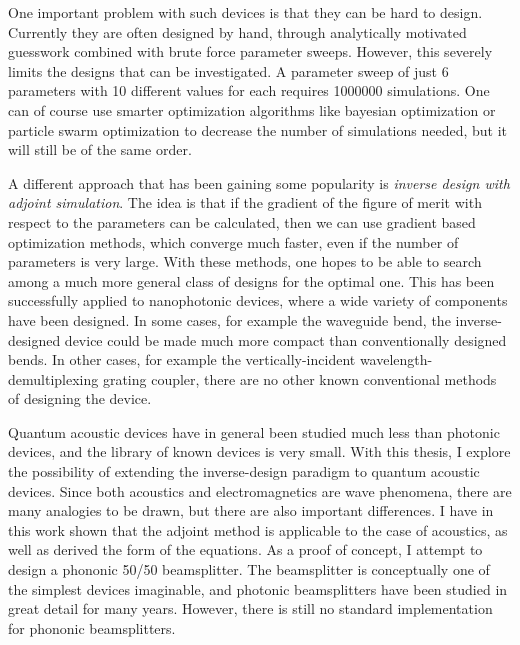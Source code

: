 One important problem with such devices is that they can be hard to design.
Currently they are often designed by hand,
through analytically motivated guesswork combined with brute force parameter
sweeps.
However, this severely limits the designs that can be investigated.
A parameter sweep of just 6 parameters with 10 different values for each
requires \num{1000000} simulations.
One can of course use smarter optimization algorithms like bayesian optimization
or particle swarm optimization\cite{zhang_compact_2013}
to decrease the number of simulations needed, but it will still be of the same
order.

A different approach that has been gaining some popularity is
\emph{inverse design with adjoint simulation}.%
\cite{molesky_inverse_2018}
The idea is that if the gradient of the figure of merit
with respect to the parameters can be calculated, then we can use gradient based
optimization methods, which converge much faster, even if the number of
parameters is very large. With these methods, one hopes to be able to search
among a much more general class of designs for the optimal one.
This has been successfully applied to nanophotonic devices,
where a wide variety of components have been designed\cite{spins2019}.
In some cases, for example the waveguide bend, the inverse-designed device could
be made much more compact than conventionally designed bends.
In other cases, for example the vertically-incident wavelength-demultiplexing
grating coupler, there are no other known conventional methods of designing the
device.

Quantum acoustic devices have in general been studied much less than photonic
devices, and the library of known devices is very small.
With this thesis, I explore the possibility of extending the inverse-design paradigm to
quantum acoustic devices.
Since both acoustics and electromagnetics are wave phenomena, there are many
analogies to be drawn, but there are also important differences.
I have in this work shown that the adjoint method is applicable to the case of
acoustics, as well as derived the form of the equations.
As a proof of concept, I attempt to design a phononic 50/50 beamsplitter.
The beamsplitter is conceptually one of the simplest devices imaginable,
and photonic beamsplitters have been studied in great detail for many years.
However, there is still no standard implementation for phononic beamsplitters.

